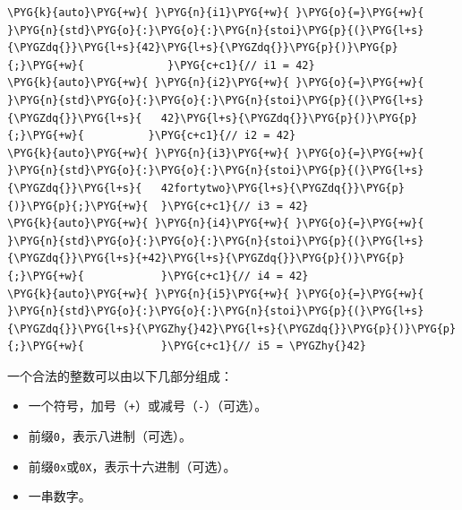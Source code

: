 \begin{codeblockbg}
\begin{Verbatim}[commandchars=\\\{\},breaklines=true,breakanywhere=true,fontsize=\codefont,xleftmargin=17bp]
\PYG{k}{auto}\PYG{+w}{ }\PYG{n}{i1}\PYG{+w}{ }\PYG{o}{=}\PYG{+w}{ }\PYG{n}{std}\PYG{o}{:}\PYG{o}{:}\PYG{n}{stoi}\PYG{p}{(}\PYG{l+s}{\PYGZdq{}}\PYG{l+s}{42}\PYG{l+s}{\PYGZdq{}}\PYG{p}{)}\PYG{p}{;}\PYG{+w}{             }\PYG{c+c1}{// i1 = 42}
\PYG{k}{auto}\PYG{+w}{ }\PYG{n}{i2}\PYG{+w}{ }\PYG{o}{=}\PYG{+w}{ }\PYG{n}{std}\PYG{o}{:}\PYG{o}{:}\PYG{n}{stoi}\PYG{p}{(}\PYG{l+s}{\PYGZdq{}}\PYG{l+s}{   42}\PYG{l+s}{\PYGZdq{}}\PYG{p}{)}\PYG{p}{;}\PYG{+w}{          }\PYG{c+c1}{// i2 = 42}
\PYG{k}{auto}\PYG{+w}{ }\PYG{n}{i3}\PYG{+w}{ }\PYG{o}{=}\PYG{+w}{ }\PYG{n}{std}\PYG{o}{:}\PYG{o}{:}\PYG{n}{stoi}\PYG{p}{(}\PYG{l+s}{\PYGZdq{}}\PYG{l+s}{   42fortytwo}\PYG{l+s}{\PYGZdq{}}\PYG{p}{)}\PYG{p}{;}\PYG{+w}{  }\PYG{c+c1}{// i3 = 42}
\PYG{k}{auto}\PYG{+w}{ }\PYG{n}{i4}\PYG{+w}{ }\PYG{o}{=}\PYG{+w}{ }\PYG{n}{std}\PYG{o}{:}\PYG{o}{:}\PYG{n}{stoi}\PYG{p}{(}\PYG{l+s}{\PYGZdq{}}\PYG{l+s}{+42}\PYG{l+s}{\PYGZdq{}}\PYG{p}{)}\PYG{p}{;}\PYG{+w}{            }\PYG{c+c1}{// i4 = 42}
\PYG{k}{auto}\PYG{+w}{ }\PYG{n}{i5}\PYG{+w}{ }\PYG{o}{=}\PYG{+w}{ }\PYG{n}{std}\PYG{o}{:}\PYG{o}{:}\PYG{n}{stoi}\PYG{p}{(}\PYG{l+s}{\PYGZdq{}}\PYG{l+s}{\PYGZhy{}42}\PYG{l+s}{\PYGZdq{}}\PYG{p}{)}\PYG{p}{;}\PYG{+w}{            }\PYG{c+c1}{// i5 = \PYGZhy{}42}
\end{Verbatim}
\end{codeblockbg}



一个合法的整数可以由以下几部分组成：



\begin{itemize}
\item 一个符号，加号（\texttt{+}）或减号（\texttt{-}）（可选）。



\item 前缀\texttt{0}，表示八进制（可选）。



\item 前缀\texttt{0x}或\texttt{0X}，表示十六进制（可选）。



\item 一串数字。

\end{itemize}


